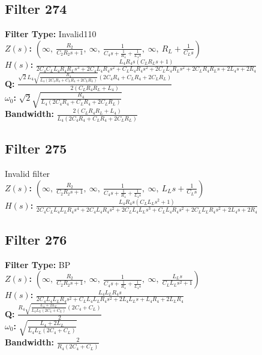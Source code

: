 \documentclass{article}
\begin{document}
\subsection*{Filter 274}
\textbf{Filter Type:} Invalid110 \\ 
\textbf{$Z(s)$:} $\left( \infty, \  \frac{R_{2}}{C_{2} R_{2} s + 1}, \  \infty, \  \frac{1}{C_{4} s + \frac{1}{R_{4}} + \frac{1}{L_{4} s}}, \  \infty, \  R_{L} + \frac{1}{C_{L} s}\right)$ \\ 
\textbf{$H(s)$:} $\frac{L_{4} R_{4} s \left(C_{L} R_{L} s + 1\right)}{2 C_{4} C_{L} L_{4} R_{4} R_{L} s^{3} + 2 C_{4} L_{4} R_{4} s^{2} + C_{L} L_{4} R_{4} s^{2} + 2 C_{L} L_{4} R_{L} s^{2} + 2 C_{L} R_{4} R_{L} s + 2 L_{4} s + 2 R_{4}}$ \\ 
\textbf{Q:} $\frac{\sqrt{2} L_{4} \sqrt{\frac{R_{4}}{L_{4} \left(2 C_{4} R_{4} + C_{L} R_{4} + 2 C_{L} R_{L}\right)}} \left(2 C_{4} R_{4} + C_{L} R_{4} + 2 C_{L} R_{L}\right)}{2 \left(C_{L} R_{4} R_{L} + L_{4}\right)}$ \\ 
\textbf{$\omega_0$:} $\sqrt{2} \sqrt{\frac{R_{4}}{L_{4} \left(2 C_{4} R_{4} + C_{L} R_{4} + 2 C_{L} R_{L}\right)}}$ \\ 
\textbf{Bandwidth:} $\frac{2 \left(C_{L} R_{4} R_{L} + L_{4}\right)}{L_{4} \left(2 C_{4} R_{4} + C_{L} R_{4} + 2 C_{L} R_{L}\right)}$ \\ 
\subsection*{Filter 275}
Invalid filter \\ 
\textbf{$Z(s)$:} $\left( \infty, \  \frac{R_{2}}{C_{2} R_{2} s + 1}, \  \infty, \  \frac{1}{C_{4} s + \frac{1}{R_{4}} + \frac{1}{L_{4} s}}, \  \infty, \  L_{L} s + \frac{1}{C_{L} s}\right)$ \\ 
\textbf{$H(s)$:} $\frac{L_{4} R_{4} s \left(C_{L} L_{L} s^{2} + 1\right)}{2 C_{4} C_{L} L_{4} L_{L} R_{4} s^{4} + 2 C_{4} L_{4} R_{4} s^{2} + 2 C_{L} L_{4} L_{L} s^{3} + C_{L} L_{4} R_{4} s^{2} + 2 C_{L} L_{L} R_{4} s^{2} + 2 L_{4} s + 2 R_{4}}$ \\ 
\subsection*{Filter 276}
\textbf{Filter Type:} BP \\ 
\textbf{$Z(s)$:} $\left( \infty, \  \frac{R_{2}}{C_{2} R_{2} s + 1}, \  \infty, \  \frac{1}{C_{4} s + \frac{1}{R_{4}} + \frac{1}{L_{4} s}}, \  \infty, \  \frac{L_{L} s}{C_{L} L_{L} s^{2} + 1}\right)$ \\ 
\textbf{$H(s)$:} $\frac{L_{4} L_{L} R_{4} s}{2 C_{4} L_{4} L_{L} R_{4} s^{2} + C_{L} L_{4} L_{L} R_{4} s^{2} + 2 L_{4} L_{L} s + L_{4} R_{4} + 2 L_{L} R_{4}}$ \\ 
\textbf{Q:} $\frac{R_{4} \sqrt{\frac{L_{4} + 2 L_{L}}{L_{4} L_{L} \left(2 C_{4} + C_{L}\right)}} \left(2 C_{4} + C_{L}\right)}{2}$ \\ 
\textbf{$\omega_0$:} $\sqrt{\frac{L_{4} + 2 L_{L}}{L_{4} L_{L} \left(2 C_{4} + C_{L}\right)}}$ \\ 
\textbf{Bandwidth:} $\frac{2}{R_{4} \left(2 C_{4} + C_{L}\right)}$ \\ 
\end{document}
